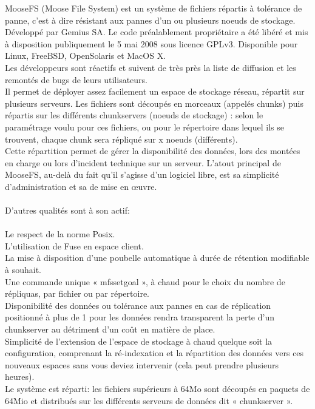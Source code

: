 \documentclass[12pt]{report}
\begin{document}
MooseFS (Moose File System) est un système de fichiers répartis à tolérance de panne, c’est à dire résistant aux pannes d’un ou plusieurs noeuds de stockage. Développé par Gemius SA. Le code préalablement propriétaire a été libéré et mis à disposition publiquement le 5 mai 2008 sous licence GPLv3. Disponible pour Linux, FreeBSD, OpenSolaris et MacOS X.\\
Les développeurs sont réactifs et suivent de très près la liste de diffusion et les remontés de bugs de leurs utilisateurs.\\
Il permet de déployer assez facilement un espace de stockage réseau, répartit sur plusieurs serveurs. 
Les fichiers sont découpés en morceaux (appelés chunks) puis répartis sur les différents chunkservers (noeuds de stockage) : selon le paramétrage voulu pour ces fichiers, ou pour le répertoire dans lequel ils se trouvent, chaque chunk sera répliqué sur x noeuds (différents).\\
Cette répartition permet de gérer la disponibilité des données, lors des montées en charge ou lors d’incident technique sur un serveur. L'atout principal de MooseFS, au-delà du fait qu'il s’agisse d’un logiciel libre, est sa simplicité d'administration et sa de mise en œuvre.\\\\
D'autres qualités sont à son actif: \\\\
Le respect de la norme Posix.\\
L'utilisation de Fuse en espace client.\\
La mise à disposition d'une poubelle automatique à durée de rétention modifiable à souhait.\\
Une commande unique « mfssetgoal », à chaud pour le choix du nombre de répliquas, par fichier ou par répertoire.\\
Disponibilité des données ou tolérance aux pannes en cas de réplication positionné à plus de 1 pour les données rendra transparent la perte d'un chunkserver au détriment d'un coût en matière de place.\\ 
Simplicité de l'extension de l'espace de stockage à chaud quelque soit la configuration, comprenant la ré-indexation et la répartition des données vers ces nouveaux espaces sans vous deviez intervenir (cela peut prendre plusieurs heures).  \\
Le système est réparti: les fichiers supérieurs à 64Mo sont découpés en paquets de 64Mio et distribués sur les différents serveurs de données dit « chunkserver ».\\
\end{document}
